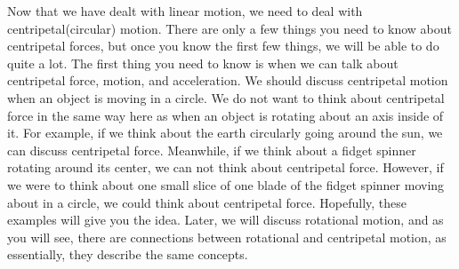 \newline

Now that we have dealt with linear motion, we need to deal with centripetal(circular) motion. There are only a few things you need to know about centripetal forces, but once you know the first few things, we will be able to do quite a lot. The first thing you need to know is when we can talk about centripetal force, motion, and acceleration. We should discuss centripetal motion when an object is moving in a circle. We do not want to think about centripetal force in the same way here as when an object is rotating about an axis inside of it. For example, if we think about the earth circularly going around the sun, we can discuss centripetal force. Meanwhile, if we think about a fidget spinner rotating around its center, we can not think about centripetal force. However, if we were to think about one small slice of one blade of the fidget spinner moving about in a circle, we could think about centripetal force. Hopefully, these examples will give you the idea. Later, we will discuss rotational motion, and as you will see, there are connections between rotational and centripetal motion, as essentially, they describe the same concepts.

